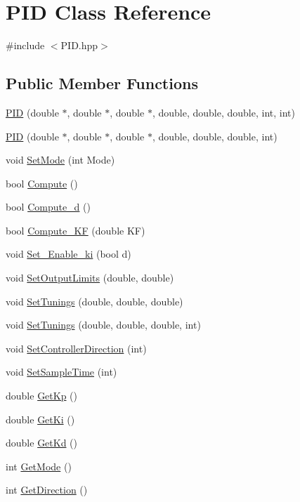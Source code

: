 \hypertarget{classPID}{}\section{P\+ID Class Reference}
\label{classPID}


{\ttfamily \#include $<$P\+I\+D.\+hpp$>$}

\subsection*{Public Member Functions}
\begin{DoxyCompactItemize}
\item 
\hyperlink{classPID_a2204e6bc67a6915a557b9c2f03c2d92d}{P\+ID} (double $\ast$, double $\ast$, double $\ast$, double, double, double, int, int)
\item 
\hyperlink{classPID_aba833737b9cb8a9da181d392a0306c1b}{P\+ID} (double $\ast$, double $\ast$, double $\ast$, double, double, double, int)
\item 
void \hyperlink{classPID_a68074bad88a8cc442ee03a036073d5d5}{Set\+Mode} (int Mode)
\item 
bool \hyperlink{classPID_a8d154fe921cba7963c49d7d2b42eccf1}{Compute} ()
\item 
bool \hyperlink{classPID_a2b197ba1ea7957ecca01424a965f4b8c}{Compute\+\_\+d} ()
\item 
bool \hyperlink{classPID_afdb34367c7ca4b540534d3af95420f03}{Compute\+\_\+\+KF} (double KF)
\item 
void \hyperlink{classPID_a1d0630b3aafcf7266c6be8f89595c0f5}{Set\+\_\+\+Enable\+\_\+ki} (bool d)
\item 
void \hyperlink{classPID_a5645914427bd740b12faa97cc25a8414}{Set\+Output\+Limits} (double, double)
\item 
void \hyperlink{classPID_a848bb1bbeabd59d38c9c955958e3e798}{Set\+Tunings} (double, double, double)
\item 
void \hyperlink{classPID_a3f6cf284c8fe43b1714b5b72758dc229}{Set\+Tunings} (double, double, double, int)
\item 
void \hyperlink{classPID_a66df966f739e19482aaba38cf9308c4e}{Set\+Controller\+Direction} (int)
\item 
void \hyperlink{classPID_aaa1e0e67a0c97571bd62b326e6cf3b2e}{Set\+Sample\+Time} (int)
\item 
double \hyperlink{classPID_ae5519c833b2887a0e6aad670d9b3d8b8}{Get\+Kp} ()
\item 
double \hyperlink{classPID_ac7ba6bc99c76c4378d699e176c81491c}{Get\+Ki} ()
\item 
double \hyperlink{classPID_a62b7e8dca41e724e1ad62dec930058d8}{Get\+Kd} ()
\item 
int \hyperlink{classPID_acc325db5e6a140b92c8199a66e03491b}{Get\+Mode} ()
\item 
int \hyperlink{classPID_a2a8674f4c8937dfdf859f6a3ad9f45d5}{Get\+Direction} ()
\end{DoxyCompactItemize}



